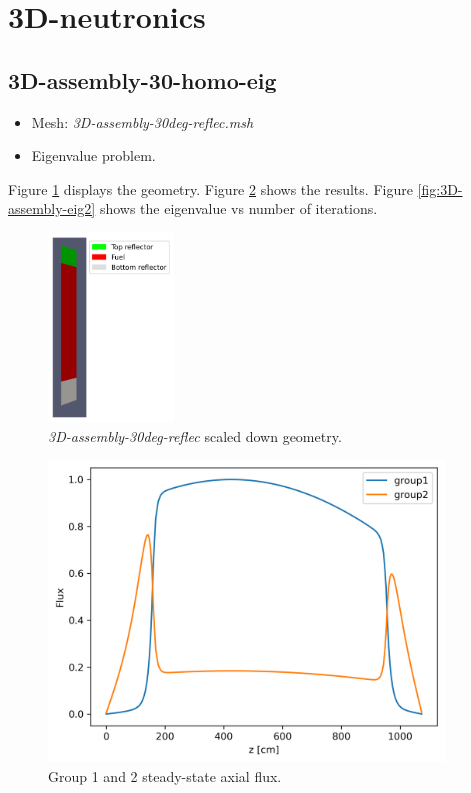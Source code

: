 \documentclass[11pt,letterpaper]{article}
\begin{document}
\section{3D-neutronics}

\subsection{3D-assembly-30-homo-eig}

	\begin{itemize}
		\item Mesh: \textit{3D-assembly-30deg-reflec.msh}
		\item Eigenvalue problem.
	\end{itemize}

Figure \ref{fig:3D-assembly-eig} displays the geometry.
Figure \ref{fig:3D-assembly-eig1} shows the results.
Figure \ref{fig:3D-assembly-eig2} shows the eigenvalue vs number of iterations.

	\begin{figure}[htbp!]
		\centering
		\includegraphics[height=5cm]{3D-assembly-30deg-reflec-meshB}
		\caption{\textit{3D-assembly-30deg-reflec} scaled down geometry.}
		\label{fig:3D-assembly-eig}
	\end{figure}

	\begin{figure}[htbp!]
		\centering
		\includegraphics[height=8cm]{3D-assembly-30-homo-eig_axial}
		\caption{Group 1 and 2 steady-state axial flux.}
		\label{fig:3D-assembly-eig1}
	\end{figure}
\end{document}
